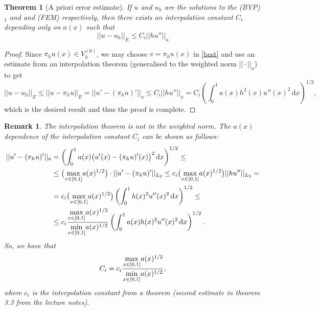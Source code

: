 \documentclass[12pt, a4paper]{article}
\newcommand{\rd}{\ensuremath{\mathrm{d}}}
\newcommand{\id}{\ensuremath{\,\rd}}
\newtheorem{theorem}{Theorem}[section]
\newtheorem{remark}{Remark}
\numberwithin{equation}{section}
\begin{document}
\begin{theorem}[A priori error estimate]
If $u$ and $u_h$ are the solutions to the \textnormal{(BVP)}$_1$ and and \textnormal{(FEM)} respectively, then there exists an interpolation constant $C_i$ depending only on $a(x)$ such that
\begin{equation*}
||u-u_h||_E \leq C_i ||hu''||_a
\end{equation*}
\end{theorem}

\begin{proof}
Since $\pi_h u(x) \in V_h^{(0)}$, we may choose $v=\pi_h u(x)$ in \eqref{best} and use an estimate from an interpolation theorem (generalised to the weighted norm $||\cdot||_a$) to get
\begin{equation*}
||u-u_h||_E \leq || u-\pi_h u ||_E = || u' - (\pi_hu)'||_a \leq C_i ||h u''||_a = C_i \left ( \int_0^1 a(x)h^2(x)u''(x)^2\id x\right )^{1/2},
\end{equation*}
which is the desired result and thus the proof is complete.
\end{proof}
\begin{remark}
The interpolation theorem is not in the weighted norm. The $a(x)$ dependence of the interpolation constant $C_i$ can be shown as follows:
\begin{equation*}
\begin{split}
||u' - (\pi_h u)'||_a &= \left ( \int_0^1 a(x)\big (u'(x)-(\pi_hu)'(x)\big)^2\id x\right)^{1/2} \leq \\
& \leq \big( \underset{x\in [0,1]}{\text{\normalfont{ max }}} a(x)^{1/2} \big )\cdot ||u'-(\pi_hu)'||_{L_2} \leq c_i \big ( \underset{x\in [0,1]}{\text{\normalfont{ max }}} a(x)^{1/2} \big )||hu''||_{L_2} = \\
&=c_i\big (\underset{x\in [0,1]}{\text{\normalfont{ max }}} a(x)^{1/2}\big ) \left (\int_0^1 h(x)^2u''(x)^2\id x\right )^{1/2} \leq \\
&\leq c_i \frac{\underset{x\in [0,1]}{\text{\normalfont{ max }}} a(x)^{1/2}}{\underset{x\in [0,1]}{\text{\normalfont{ min }}}a(x)^{1/2}}\left ( \int_0^1 a(x)h(x)^2u''(x)^2 \id x \right )^{1/2}.
\end{split}
\end{equation*}
So, we have that 
\begin{equation*}
C_i = c_i \frac{\underset{x\in [0,1]}{\text{\normalfont{ max }}}a(x)^{1/2}}{\underset{x\in [0,1]}{\text{\normalfont{ min }}}a(x)^{1/2}},
\end{equation*}
where $c_i$ is the interpolation constant from a theorem (second estimate in theorem 3.3 from the lecture notes).
\end{remark}
\end{document}
